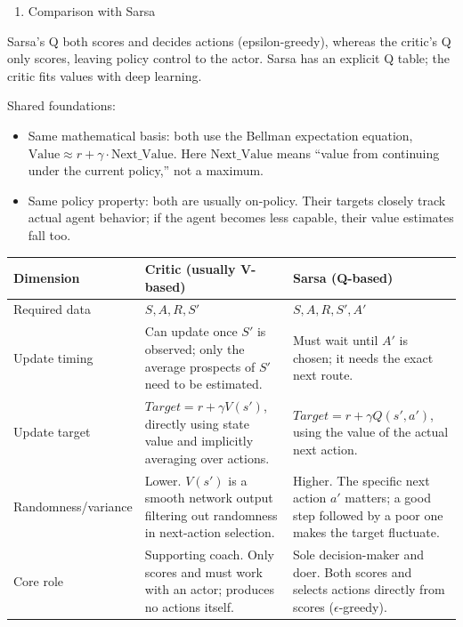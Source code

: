 \begin{enumerate}
\def\labelenumi{(\arabic{enumi})}
\tightlist
\item
  Comparison with Sarsa
\end{enumerate}

Sarsa's Q both scores and decides actions (epsilon-greedy), whereas the critic's Q only scores, leaving policy control to the actor. Sarsa has an explicit Q table; the critic fits values with deep learning.

Shared foundations:

\begin{itemize}
\tightlist
\item
  Same mathematical basis: both use the Bellman expectation equation, \(\mathrm{Value}\approx r+\gamma\cdot\mathrm{Next\_Value}\). Here \(\mathrm{Next\_Value}\) means ``value from continuing under the current policy,'' not a maximum.
\item
  Same policy property: both are usually on-policy. Their targets closely track actual agent behavior; if the agent becomes less capable, their value estimates fall too.
\end{itemize}

\begin{longtable}[]{@{}
  >{\raggedright\arraybackslash}p{}
  >{\raggedright\arraybackslash}p{}
  >{\raggedright\arraybackslash}p{}@{}}
\toprule
Dimension & Critic (usually V-based) & Sarsa (Q-based) \\
\midrule
\endhead
Required data & \(S,A,R,S'\) & \(S,A,R,S',A'\) \\
Update timing & Can update once \(S'\) is observed; only the average prospects of \(S'\) need to be estimated. & Must wait until \(A'\) is chosen; it needs the exact next route. \\
Update target & \(Target=r+\gamma V(s')\), directly using state value and implicitly averaging over actions. & \(Target=r+\gamma Q(s',a')\), using the value of the actual next action. \\
Randomness/variance & Lower. \(V(s')\) is a smooth network output filtering out randomness in next-action selection. & Higher. The specific next action \(a'\) matters; a good step followed by a poor one makes the target fluctuate. \\
Core role & Supporting coach. Only scores and must work with an actor; produces no actions itself. & Sole decision-maker and doer. Both scores and selects actions directly from scores (\(\epsilon\)-greedy). \\
\bottomrule
\end{longtable}

